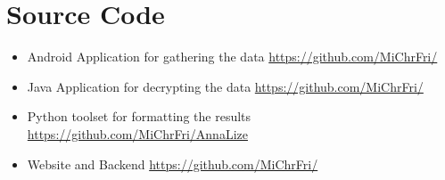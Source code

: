 \chapter{Source Code}


\begin{itemize}
\item Android Application for gathering the data
\subitem \url{https://github.com/MiChrFri/}

\item Java Application for decrypting the data
\subitem \url{https://github.com/MiChrFri/}

\item Python toolset for formatting the results
\subitem \url{https://github.com/MiChrFri/AnnaLize}

\item Website and Backend
\subitem \url{https://github.com/MiChrFri/}

\end{itemize}
